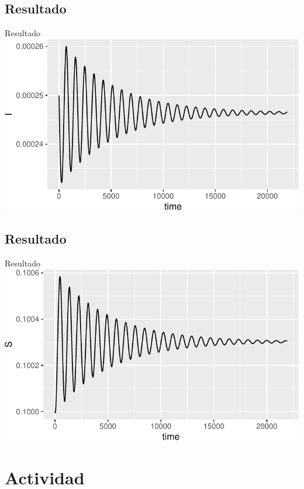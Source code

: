 \documentclass[
  11pt,
  ignorenonframetext,
]{beamer}
\begin{document}
\hypertarget{resultado}{%
\subsection{Resultado}\label{resultado}}

\begin{frame}{Resultado}
\includegraphics{Analisis-estabilidad_files/figure-beamer/unnamed-chunk-4-1.pdf}
\end{frame}

\hypertarget{resultado-1}{%
\subsection{Resultado}\label{resultado-1}}

\begin{frame}{Resultado}
\includegraphics{Analisis-estabilidad_files/figure-beamer/unnamed-chunk-5-1.pdf}
\end{frame}

\hypertarget{actividad}{%
\section{Actividad}\label{actividad}}
\end{document}
